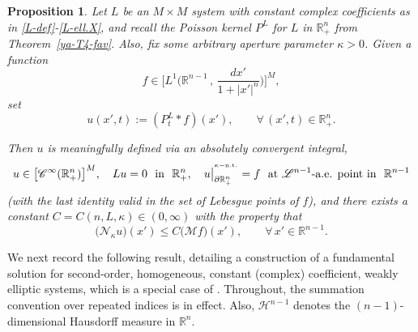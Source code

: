 \documentclass[11pt,reqno]{amsart}
\numberwithin{equation}{section}
\newtheorem{proposition}[theorem]{Proposition}
\theoremstyle{remark}
\begin{document}
\begin{proposition}\label{thm:existence}
Let $L$ be an $M\times M$ system with constant complex coefficients as in \eqref{L-def}-\eqref{L-ell.X}, 
and recall the Poisson kernel $P^L$ for $L$ in $\mathbb{R}^{n}_{+}$ from Theorem~\ref{ya-T4-fav}.
Also, fix some arbitrary aperture parameter $\kappa>0$. 
Given a function 
%
\begin{equation}\label{exist:f}
f\in\Big[L^1\Big(\mathbb{R}^{n-1}\,,\,\frac{dx'}{1+|x'|^n}\Big)\Big]^M,
\end{equation}
%
set
%
\begin{equation}\label{exist:u}
u(x',t):=(P^L_t\ast f)(x'),\qquad\forall\,(x',t)\in{\mathbb{R}}^n_{+}.
\end{equation}

Then $u$ is meaningfully defined via an absolutely convergent integral,
%
\begin{equation}\label{exist:u2}
u\in\big[\mathscr{C}^\infty(\mathbb{R}^n_{+})\big]^{M},\quad
Lu=0\,\,\text{ in }\,\,\mathbb{R}^{n}_{+},\quad
u\big|_{\partial\mathbb{R}^{n}_{+}}^{{}^{\kappa-{\rm n.t.}}}=f
\,\,\text{ at ${\mathscr{L}}^{n-1}$-a.e. point in }\,\,\mathbb{R}^{n-1}
\end{equation}
%
{\rm (}with the last identity valid in the set of Lebesgue points of $f${\rm )}, 
and there exists a constant $C=C(n,L,\kappa)\in(0,\infty)$ with the property that
%
\begin{equation}\label{exist:Nu-Mf}
\big(\mathcal{N}_{\kappa}u\big)(x')\leq C\big(\mathcal{M}f\big)(x'),\qquad\forall\,x'\in\mathbb{R}^{n-1}.
\end{equation}
\end{proposition}
 
We next record the following result, detailing a construction of a fundamental solution 
for second-order, homogeneous, constant (complex) coefficient, weakly elliptic systems, which is a special 
case of \cite[Theorem~11.1, pp.\,393--396]{DMit18}. Throughout, the summation convention over repeated indices is in effect.
Also, ${\mathcal{H}}^{n-1}$ denotes the $(n-1)$-dimensional Hausdorff measure in ${\mathbb{R}}^n$. 
\end{document}
